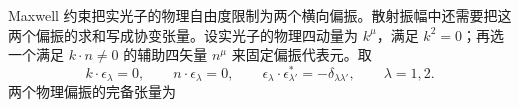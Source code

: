 
Maxwell 约束把实光子的物理自由度限制为两个横向偏振。散射振幅中还需要把这两个偏振的求和写成协变张量。设实光子的物理四动量为 $k^\mu$，满足 $k^2=0$；再选一个满足 $k\!\cdot n\neq0$ 的辅助四矢量 $n^\mu$ 来固定偏振代表元。取
\begin{equation}
 k\!\cdot\epsilon_\lambda=0,
 \qquad
 n\!\cdot\epsilon_\lambda=0,
 \qquad
 \epsilon_\lambda\!\cdot\epsilon_{\lambda'}^*=-\delta_{\lambda\lambda'},
 \qquad \lambda=1,2.
 \label{eq:physical-photon-polarization-constraints-r68}
\end{equation}
两个物理偏振的完备张量为


